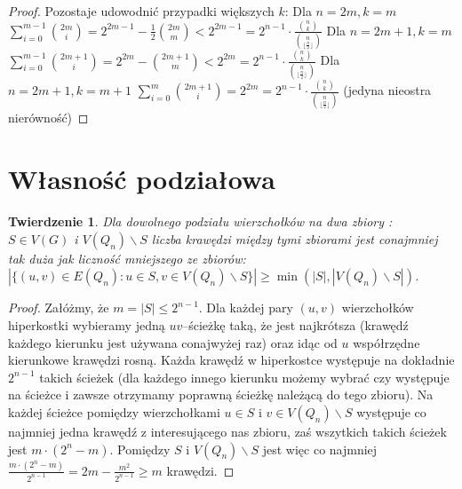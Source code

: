 \documentclass{pracamgr}
\newtheorem{theorem}{Twierdzenie}
\begin{document}
\begin{proof}
    Pozostaje udowodnić przypadki większych $k$:\newline
    Dla $n=2m,k=m$ $\sum_{i=0}^{m-1}{2m\choose i}=2^{2m-1}-\frac{1}{2}{2m\choose m}<2^{2m-1}=
    2^{n-1}\cdot\frac{{n\choose k}}{{n\choose \lfloor\frac{n}{2}\rfloor}}$\newline
    Dla $n=2m+1,k=m$ $\sum_{i=0}^{m-1}{2m+1\choose i}=2^{2m}-{2m+1\choose m}<2^{2m}=
    2^{n-1}\cdot\frac{{n\choose k}}{{n\choose \lfloor\frac{n}{2}\rfloor}}$\newline
    Dla $n=2m+1,k=m+1$ $\sum_{i=0}^{m}{2m+1\choose i}=2^{2m}=
    2^{n-1}\cdot\frac{{n\choose k}}{{n\choose \lfloor\frac{n}{2}\rfloor}}$ (jedyna nieostra nierówność)\newline
   \end{proof}%
  \section{Własność podziałowa}%
   \begin{theorem}\label{wlasnosc podzialowa}
    Dla dowolnego podziału wierzchołków na dwa zbiory : $S\in V(G)$ i $V(Q_n)\backslash S$
    liczba krawędzi między tymi zbiorami jest conajmniej tak duża jak liczność mniejszego ze zbiorów:
    $|\{(u,v)\in E(Q_n):u\in S,v\in V(Q_n)\backslash S\}|\ge\min(|S|,|V(Q_n)\backslash S|)$.
   \end{theorem}
   \begin{proof}%
    Załóżmy, że $m=|S|\le 2^{n-1}$.\newline
    Dla każdej pary $(u,v)$ wierzchołków hiperkostki wybieramy jedną $uv$--ścieżkę taką, że jest najkrótsza
    (krawędź każdego kierunku jest używana conajwyżej raz) oraz idąc od $u$ współrzędne kierunkowe krawędzi rosną.
    Każda krawędź w hiperkostce występuje na dokładnie $2^{n-1}$ takich ścieżek
    (dla każdego innego kierunku możemy wybrać czy występuje na ścieżce i zawsze otrzymamy poprawną ścieżkę należącą do tego zbioru).
    Na każdej ścieżce pomiędzy wierzchołkami $u\in S$ i $v\in V(Q_n)\backslash S$ występuje co najmniej jedna krawędź z interesującego nas zbioru,
    zaś wszytkich takich ścieżek jest $m\cdot(2^n-m)$. Pomiędzy $S$ i $V(Q_n)\backslash S$ jest więc co najmniej
    $\frac{m\cdot(2^n-m)}{2^{n-1}}=2m-\frac{m^2}{2^{n-1}}\ge m$ krawędzi. 
   \end{proof}
\end{document}

